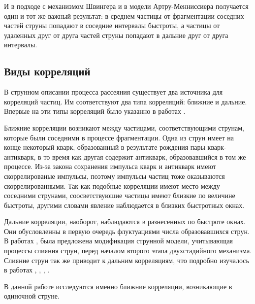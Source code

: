 \documentclass[12pt]{article}
\begin{document}
И в подходе с механизмом Швингера и в модели Артру-Менниссиера получается один и тот же важный результат: в среднем частицы от фрагментации соседних частей струны попадают в соседние интервалы быстроты, а частицы от удаленных друг от друга частей струны попадают в дальние друг от друга интервалы.

\subsection{Виды корреляций}
\qquad В струнном описании процесса рассеяния существует два источника для корреляций частиц. Им соответствуют два типа корреляций: ближние и дальние. Впервые на эти типы корреляций было указанно в работах \cite{cappela}.

Ближние корреляции возникают между частицами, соответствующими струнам, которые были соседними в процессе фрагментации. Одна из струн имеет на конце некоторый кварк, образованный в результате рождения пары кварк-антикварк, в то время как другая содержит антикварк, образовавшийся в том же процессе. Из-за закона сохранения импульса кварк и антикварк имеют скоррелированые импульсы, поэтому импульсы частиц тоже оказываются скоррелированными. Так-как подобные корреляции имеют место между соседними струнами, соосветствуюшие частицы имеют близкие по величине быстроты, другими словами явление наблюдается в близких быстротных окнах.

Дальние корреляции, наоборот, наблюдаются в разнесенных по быстроте окнах. Они обусловленны в первую очередь флуктуациями числа образовавшихся струн. В работах \cite{fusion1}, \cite{fusion2} была предложена модификация струнной модели, учитывающая процессы слияния струн, перед началом второго этапа двухстадийного механизма.
Слияние струн так же приводит к дальним корреляциям, что подробно изучалось в работах \cite{fusion_corr1}, \cite{fusion_corr2}, \cite{fusion_corr3}, \cite{fusion_corr4}.

В данной работе исследуются именно ближние корреляции, возникающие в одиночной струне.
\end{document}
